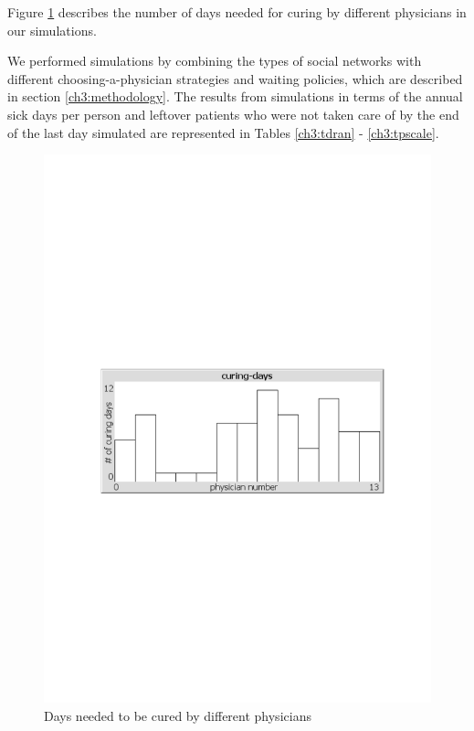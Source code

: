 Figure \ref{ch3:fdays} describes the number of days needed for curing by different physicians in our simulations.

We performed simulations by combining the types of social networks with different choosing-a-physician strategies and waiting policies, which are described in section \ref{ch3:methodology}. The results from simulations in terms of the annual sick days per person and leftover patients who were not taken care of by the end of the last day simulated are represented in Tables \ref{ch3:tdran} - \ref{ch3:tpscale}.

\begin{figure}
\centering
\includegraphics[scale=0.6]{chap3/chap3-fdays.pdf}
\caption{Days needed to be cured by different physicians}
\label{ch3:fdays}
\end{figure}

